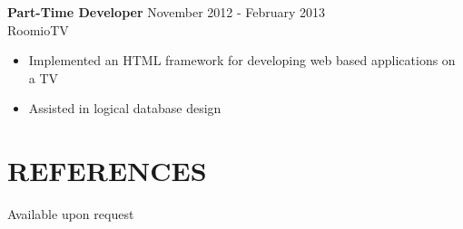 \documentclass[line,margin]{res}
\begin{document}
\begin{resume}


   
                {\bf Part-Time Developer} \hfill            November 2012 - February 2013\\
                  RoomioTV
                  \begin{itemize}  \itemsep -2pt %
                     \item Implemented an HTML framework for developing web based applications on a TV
                     \item Assisted in logical database design
                 \end{itemize} 
 
	
	
\section{REFERENCES}
	Available upon request


             
\end{resume}
\end{document}
